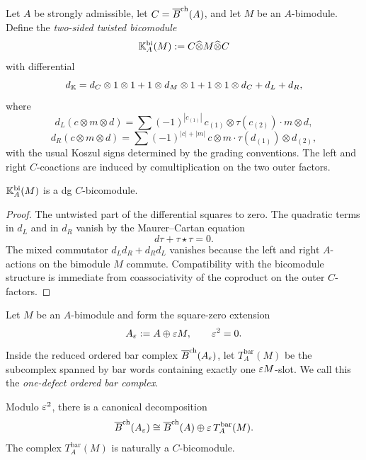 \begin{definition}
Let $A$ be strongly admissible, let $C=\overline{B}^{\mathrm{ch}}(A)$, and let $M$ be an $A$-bimodule.
Define the \emph{two-sided twisted bicomodule}
\[
\mathbb{K}_A^{\mathrm{bi}}(M):=C\widehat\otimes M\widehat\otimes C
\]
with differential
\[
d_{\mathbb{K}}
=
d_C\otimes 1\otimes 1 + 1\otimes d_M\otimes 1 + 1\otimes 1\otimes d_C + d_L+d_R,
\]
where
\[
d_L(c\otimes m\otimes d)
=
\sum (-1)^{|c_{(1)}|}\, c_{(1)}\otimes \tau(c_{(2)})\cdot m\otimes d,
\]
\[
d_R(c\otimes m\otimes d)
=
\sum (-1)^{|c|+|m|}\, c\otimes m\cdot \tau(d_{(1)})\otimes d_{(2)},
\]
with the usual Koszul signs determined by the grading conventions.
The left and right $C$-coactions are induced by comultiplication on the two outer factors.
\end{definition}

\begin{lemma}[\ClaimStatusProvedHere]
$\mathbb{K}_A^{\mathrm{bi}}(M)$ is a dg $C$-bicomodule.
\end{lemma}

\begin{proof}
The untwisted part of the differential squares to zero. The quadratic terms in $d_L$ and in $d_R$
vanish by the Maurer--Cartan equation
\[
d\tau+\tau\star\tau=0.
\]
The mixed commutator $d_Ld_R+d_Rd_L$ vanishes because the left and right $A$-actions on the
bimodule $M$ commute. Compatibility with the bicomodule structure is immediate from coassociativity
of the coproduct on the outer $C$-factors.
\end{proof}

\begin{definition}
Let $M$ be an $A$-bimodule and form the square-zero extension
\[
A_\varepsilon:=A\oplus \varepsilon M,\qquad \varepsilon^2=0.
\]
Inside the reduced ordered bar complex $\overline{B}^{\mathrm{ch}}(A_\varepsilon)$, let $T_A^{\mathrm{bar}}(M)$ be the
subcomplex spanned by bar words containing exactly one $\varepsilon M$-slot.
We call this the \emph{one-defect ordered bar complex}.
\end{definition}

\begin{proposition}[\ClaimStatusProvedHere]
Modulo $\varepsilon^2$, there is a canonical decomposition
\[
\overline{B}^{\mathrm{ch}}(A_\varepsilon)\cong \overline{B}^{\mathrm{ch}}(A)\oplus \varepsilon\, T_A^{\mathrm{bar}}(M).
\]
The complex $T_A^{\mathrm{bar}}(M)$ is naturally a $C$-bicomodule.
\end{proposition}

